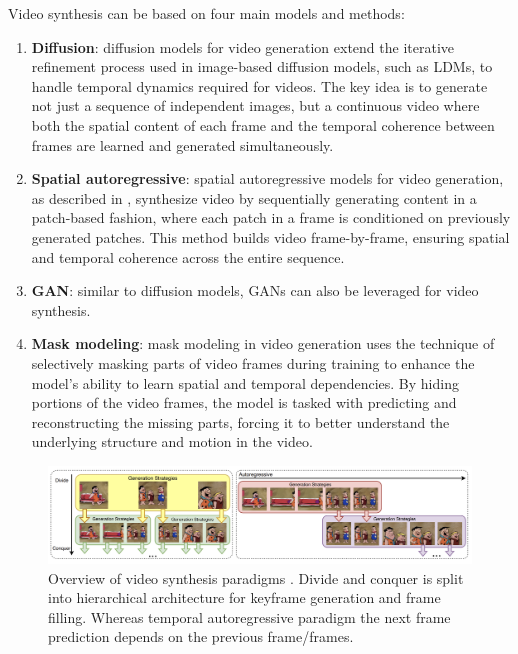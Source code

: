 Video synthesis can be based on four main models and methods:

\begin{enumerate}
    \item \textbf{Diffusion}: diffusion models for video generation extend the iterative refinement process used in image-based diffusion models, such as LDMs, to handle temporal dynamics required for videos. The key idea is to generate not just a sequence of independent images, but a continuous video where both the spatial content of each frame and the temporal coherence between frames are learned and generated simultaneously.
    \item \textbf{Spatial autoregressive}: spatial autoregressive models for video generation, as described in \cite{graves2013generating}, synthesize video by sequentially generating content in a patch-based fashion, where each patch in a frame is conditioned on previously generated patches. This method builds video frame-by-frame, ensuring spatial and temporal coherence across the entire sequence.
    \item \textbf{GAN}: similar to diffusion models, GANs can also be leveraged for video synthesis. 
    \item \textbf{Mask modeling}: mask modeling in video generation uses the technique of selectively masking parts of video frames during training to enhance the model's ability to learn spatial and temporal dependencies. By hiding portions of the video frames, the model is tasked with predicting and reconstructing the missing parts, forcing it to better understand the underlying structure and motion in the video.
\end{enumerate}

\begin{figure}
    \centering
    \includegraphics[width=1\textwidth]{images/video_synthesis/paradigms.png}
    \caption{Overview of video synthesis paradigms \cite{long_video_survey}. Divide and conquer is split into hierarchical architecture for keyframe generation and frame filling. Whereas temporal autoregressive paradigm the next frame prediction depends on the previous frame/frames.}
    \label{fig:video_synthesis_paradigms}
\end{figure}

